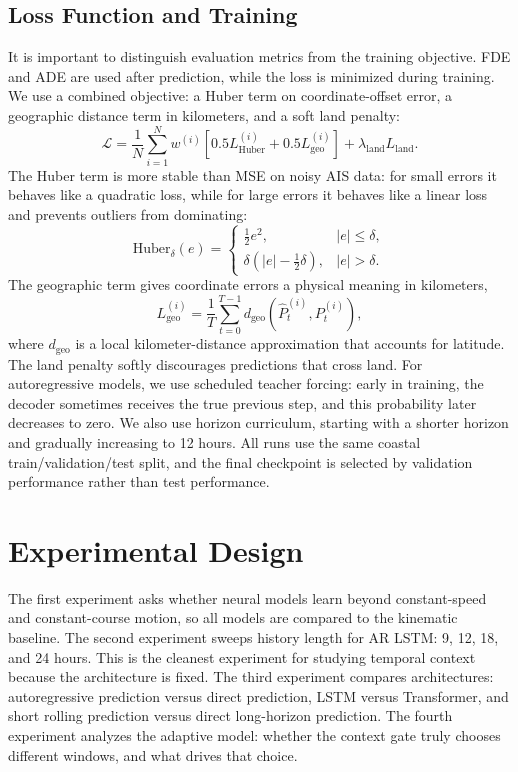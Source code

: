 \subsection{Loss Function and Training}
It is important to distinguish evaluation metrics from the training objective. FDE and ADE are used after prediction, while the loss is minimized during training. We use a combined objective: a Huber term on coordinate-offset error, a geographic distance term in kilometers, and a soft land penalty:
\[
\mathcal{L}=\frac{1}{N}\sum_{i=1}^{N}w^{(i)}\left[0.5L_{\mathrm{Huber}}^{(i)}+0.5L_{\mathrm{geo}}^{(i)}\right]+\lambda_{\mathrm{land}}L_{\mathrm{land}}.
\]
The Huber term is more stable than MSE on noisy AIS data: for small errors it behaves like a quadratic loss, while for large errors it behaves like a linear loss and prevents outliers from dominating:
\[
\mathrm{Huber}_{\delta}(e)=\begin{cases}
\frac{1}{2}e^2, & |e|\leq\delta,\\
\delta\left(|e|-\frac{1}{2}\delta\right), & |e|>\delta.
\end{cases}
\]
The geographic term gives coordinate errors a physical meaning in kilometers,
\[
L_{\mathrm{geo}}^{(i)}=\frac{1}{T}\sum_{t=0}^{T-1}d_{\mathrm{geo}}\!\left(\hat{P}_{t}^{(i)},P_t^{(i)}\right),
\]
where $d_{\mathrm{geo}}$ is a local kilometer-distance approximation that accounts for latitude. The land penalty softly discourages predictions that cross land. For autoregressive models, we use scheduled teacher forcing: early in training, the decoder sometimes receives the true previous step, and this probability later decreases to zero. We also use horizon curriculum, starting with a shorter horizon and gradually increasing to 12 hours. All runs use the same coastal train/validation/test split, and the final checkpoint is selected by validation performance rather than test performance.

\section{Experimental Design}
The first experiment asks whether neural models learn beyond constant-speed and constant-course motion, so all models are compared to the kinematic baseline. The second experiment sweeps history length for AR LSTM: 9, 12, 18, and 24 hours. This is the cleanest experiment for studying temporal context because the architecture is fixed. The third experiment compares architectures: autoregressive prediction versus direct prediction, LSTM versus Transformer, and short rolling prediction versus direct long-horizon prediction. The fourth experiment analyzes the adaptive model: whether the context gate truly chooses different windows, and what drives that choice.

